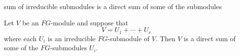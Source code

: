 \documentclass[avery5371,grid]{flashcards}
\begin{document}
\begin{flashcard}[Propostion 7.12]{sum of irreducible submodules is a
    direct sum of some of the submodules}

  Let $V$ be an $FG$-module and suppose that
  \[
    V = U_1 + \cdots + U_r
  \]
  where each $U_i$ is an irreducible $FG$-submodule of $V$. Then $V$
  is a direct sum of some of the $FG$-submodules $U_i$.

\end{flashcard}

\end{document}
